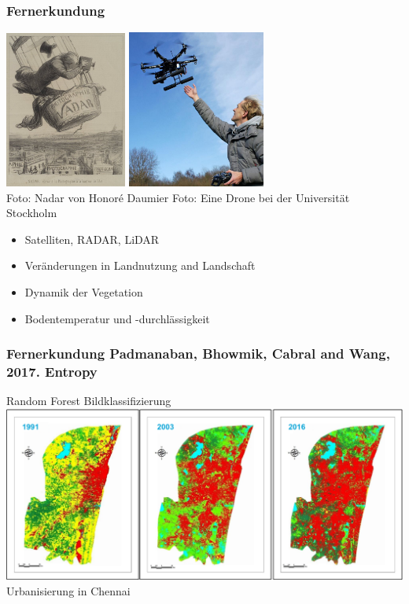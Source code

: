 \documentclass{beamer}
\begin{document}
\begin{frame}
\frametitle{Fernerkundung}
\vspace{0.2cm}\includegraphics[width=0.3\textwidth]{Figures/remote_sensing.png}
\hspace{1cm}\includegraphics[width=0.34\textwidth]{Figures/drone.png}\\
\tiny Foto: Nadar von Honoré Daumier 
\hspace{1.1cm} Foto: Eine Drone bei der Universität Stockholm\\
\pause
\small
\begin{itemize}
\item Satelliten, RADAR, LiDAR
\item Veränderungen in Landnutzung and Landschaft
\item Dynamik der Vegetation
\item Bodentemperatur und -durchlässigkeit
\end{itemize}
\end{frame}


\begin{frame}
\frametitle{Fernerkundung \hspace{1cm} \tiny Padmanaban, Bhowmik, Cabral and Wang, 2017. Entropy}
Random Forest Bildklassifizierung
\includegraphics[width=1.05\textwidth]{Figures/RS1.png}\\
Urbanisierung in Chennai
\end{frame}
\end{document}
